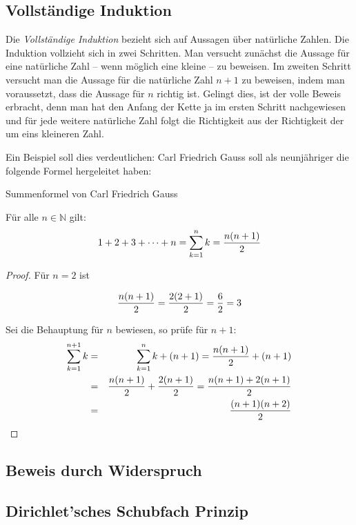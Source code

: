 \subsection{Vollständige Induktion}

Die \textsl{Vollständige Induktion} bezieht sich auf Aussagen über natürliche Zahlen. Die Induktion vollzieht sich in zwei Schritten. Man versucht zunächst die Aussage für eine natürliche Zahl -- wenn möglich eine kleine -- zu beweisen. Im zweiten Schritt versucht man die Aussage für die natürliche Zahl $n+1$ zu beweisen, indem man voraussetzt, dass die Aussage für $n$ richtig ist. Gelingt dies, ist der volle Beweis erbracht, denn man hat den Anfang der Kette ja im ersten Schritt nachgewiesen und für jede weitere natürliche Zahl folgt die Richtigkeit aus der Richtigkeit der um eins kleineren Zahl.

Ein Beispiel soll dies verdeutlichen: Carl Friedrich Gauss soll als neunjähriger die folgende Formel hergeleitet haben:

\begin{theorem}
Summenformel von Carl Friedrich Gauss
\begin{claim}
Für alle $n\in \mathbb{N}$ gilt:
\[ 1+2+3+ \dots +n = \sum_{k=1}^{n}k = {n(n+1)\over 2} \]
\end{claim}
\begin{proof}
Für $n=2$ ist

\[ {n(n+1)\over 2} = {2(2+1)\over 2} = {6\over 2} = 3 \]

Sei die Behauptung für $n$ bewiesen, so prüfe für $n+1$:
\begin{eqnarray*}
\sum_{k=1}^{n+1} k &=& \sum_{k=1}^{n} k  + (n+1) = {n(n+1)\over 2} +(n+1) \\
 &=& {n(n+1)\over 2} +{2(n+1)\over 2} = {n(n+1)+2(n+1) \over 2} \\
 &=& {(n+1)(n+2) \over 2}
\end{eqnarray*}
\end{proof}

\end{theorem}


\subsection{Beweis durch Widerspruch}

\subsection{Dirichlet'sches Schubfach Prinzip}
